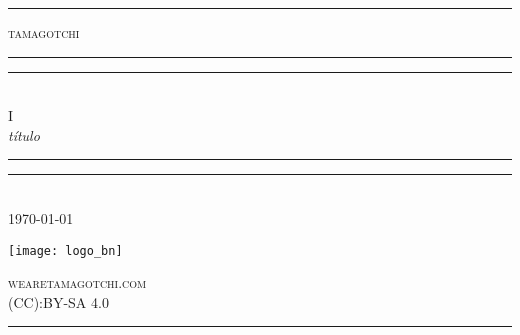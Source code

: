 
\begin{titlepage}
\centering
\settowidth{\unitlength}{\LARGE WE ARE TAMAGOTCHI}

\rule{\unitlength}{0.4pt}

\vspace*{\baselineskip}

{\LARGE\scshape tamagotchi}\\[\baselineskip]

\rule{\unitlength}{1.6pt}\vspace*{-\baselineskip}\vspace*{2pt}
\rule{\unitlength}{0.4pt}\\[\baselineskip]

{\LARGE I}\\[\baselineskip]

{\itshape título}\\[0.2\baselineskip]

\rule{\unitlength}{0.4pt}\vspace*{-\baselineskip}\vspace{3.2pt}
\rule{\unitlength}{1.6pt}\\[\baselineskip]

{\large\scshape \today}\par

\vfill

\texttt{[image: logo\_bn]}
\vspace*{0.5\baselineskip}

{\large\scshape wearetamagotchi.com}\\[\baselineskip]
{\small\scshape (CC):BY-SA 4.0}\par
\rule{\unitlength}{0.4pt}

\end{titlepage}
